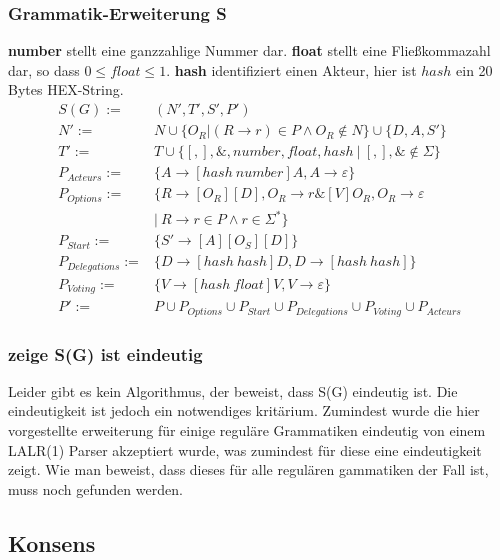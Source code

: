 \documentclass[a4paper,12pt]{article}
\begin{document}
\subsubsection*{Grammatik-Erweiterung S}

\textbf{number} stellt eine ganzzahlige Nummer dar. \textbf{float}
stellt eine Fließkommazahl dar, so dass $0\leq float \leq 1$. \textbf{hash} identifiziert einen Akteur, hier ist $hash$ ein 20 Bytes HEX-String. \\

\begin{align}
  S(G) :=& (N', T', S', P') \\
  N' :=& N \cup \{ O_R | (R\rightarrow r)\in P\land O_R \notin N\}\cup\{D, A, S'\}\\
  T' :=& T \cup \{[ , ], \&, number, float, hash\ |\ [,],\& \notin \Sigma \}\\
  P_{Acteurs} :=& \{A\rightarrow[hash\ number]A,A\rightarrow \varepsilon\} \\
  P_{Options} :=& \{R \rightarrow [O_R][D], O_R \rightarrow r\& [V] O_R, O_R \rightarrow \varepsilon \ \nonumber\\
  &\vert\ R\rightarrow r\in P \land r\in \Sigma^*\} \\
  P_{Start} :=& \{S'\rightarrow [A][O_S][D]\} \\
  P_{Delegations} :=& \{D\rightarrow [hash\ hash]D,D\rightarrow [hash\ hash]\} \\
  P_{Voting} :=& \{V\rightarrow [hash\ float]V, V \rightarrow \varepsilon\} \\
  P' :=& P
  \cup P_{Options} 
  \cup P_{Start} 
  \cup P_{Delegations} 
  \cup P_{Voting} 
  \cup P_{Acteurs}
\end{align}


\subsubsection*{zeige S(G) ist eindeutig}
Leider gibt es kein Algorithmus, der beweist, dass S(G) eindeutig ist. Die eindeutigkeit ist jedoch ein notwendiges kritärium. Zumindest wurde die hier vorgestellte erweiterung für einige reguläre Grammatiken eindeutig von einem LALR(1) Parser akzeptiert wurde, was zumindest für diese eine eindeutigkeit zeigt. Wie man beweist, dass dieses für alle regulären gammatiken der Fall ist, muss noch gefunden werden.

\subsection{Konsens}
\end{document}
